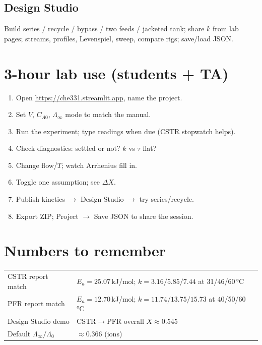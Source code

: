\documentclass[11pt,a4paper]{article}
\begin{document}
\subsection{Design Studio}
Build series / recycle / bypass / two feeds / jacketed tank; share \(k\) from lab pages; streams, profiles, Levenspiel,
sweep, compare rigs; save/load JSON.

\section{3-hour lab use (students + TA)}

\begin{enumerate}
  \item Open \url{https://che331.streamlit.app}, name the project.
  \item Set \(V\), \(C_{A0}\), \(\Lambda_\infty\) mode to match the manual.
  \item Run the experiment; type readings when due (CSTR stopwatch helps).
  \item Check diagnostics: settled or not? \(k\) vs \(\tau\) flat?
  \item Change flow/\(T\); watch Arrhenius fill in.
  \item Toggle one assumption; see \(\Delta X\).
  \item Publish kinetics \(\to\) Design Studio \(\to\) try series/recycle.
  \item Export ZIP; Project \(\to\) Save JSON to share the session.
\end{enumerate}

\section{Numbers to remember}

\begin{center}\small
\begin{tabular}{@{}ll@{}}
\toprule
CSTR report match & \(E_a=25.07\)\,kJ/mol; \(k=3.16/5.85/7.44\) at 31/46/60\,°C \\
PFR report match & \(E_a=12.70\)\,kJ/mol; \(k=11.74/13.75/15.73\) at 40/50/60\,°C \\
Design Studio demo & CSTR\(\to\)PFR overall \(X\approx 0.545\) \\
Default \(\Lambda_\infty/\Lambda_0\) & \(\approx 0.366\) (ions) \\
\bottomrule
\end{tabular}
\end{center}
\end{document}
